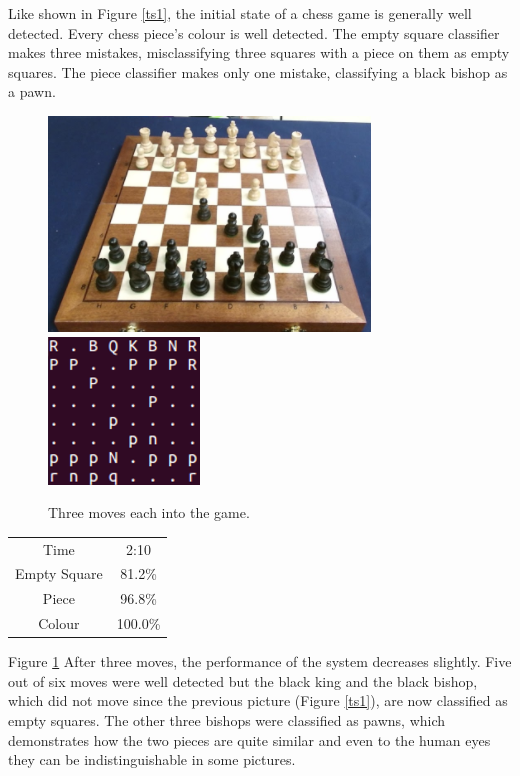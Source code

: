 \documentclass{l4proj}
\begin{document}
Like shown in Figure \ref{ts1}, the initial state of a chess game is generally well detected. Every chess piece's colour is well detected. The empty square classifier makes three mistakes, misclassifying three squares with a piece on them as empty squares. The piece classifier makes only one mistake, classifying a black bishop as a pawn.

\begin{figure}[h!]
\includegraphics[scale=0.8]{ts/ts2.png} \includegraphics[scale=0.75]{ts/tsd2.png}
\caption{Three moves each into the game.}
\label{ts2}
\end{figure}

\begin{table}[h!]
\centering
\begin{tabular}{|c|c|}
	\hline
	Time & 2:10 \\
	\rowcolor{brown!45}Empty Square & 81.2\%  \\
	Piece & 96.8\% \\
	\rowcolor{brown!45} Colour & 100.0\% \\
	\hline
\end{tabular}
\end{table}

Figure \ref{ts2} After three moves, the performance of the system decreases slightly. Five out of six moves were well detected but the black king and the black bishop, which did not move since the previous picture (Figure \ref{ts1}), are now classified as empty squares. The other three bishops were classified as pawns, which demonstrates how the two pieces are quite similar and even to the human eyes they can be indistinguishable in some pictures.
\end{document}
